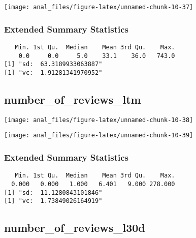 \begin{center}\texttt{[image: anal\_files/figure-latex/unnamed-chunk-10-37]} \end{center}

\hypertarget{extended-summary-statistics-11}{%
\subsubsection{Extended Summary
Statistics}\label{extended-summary-statistics-11}}

\begin{verbatim}   Min. 1st Qu.  Median    Mean 3rd Qu.    Max. 
    0.0     0.0     5.0    33.1    36.0   743.0 
[1] "sd:  63.3189933063887"
[1] "vc:  1.91281341970952"
\end{verbatim}

\pagebreak

\centering

\hypertarget{number_of_reviews_ltm}{%
\subsection{number\_of\_reviews\_ltm}\label{number_of_reviews_ltm}}

\begin{center}\texttt{[image: anal\_files/figure-latex/unnamed-chunk-10-38]} \end{center}

\begin{center}\texttt{[image: anal\_files/figure-latex/unnamed-chunk-10-39]} \end{center}

\hypertarget{extended-summary-statistics-12}{%
\subsubsection{Extended Summary
Statistics}\label{extended-summary-statistics-12}}

\begin{verbatim}   Min. 1st Qu.  Median    Mean 3rd Qu.    Max. 
  0.000   0.000   1.000   6.401   9.000 278.000 
[1] "sd:  11.1280843101846"
[1] "vc:  1.73849026164919"
\end{verbatim}

\pagebreak

\centering

\hypertarget{number_of_reviews_l30d}{%
\subsection{number\_of\_reviews\_l30d}\label{number_of_reviews_l30d}}

